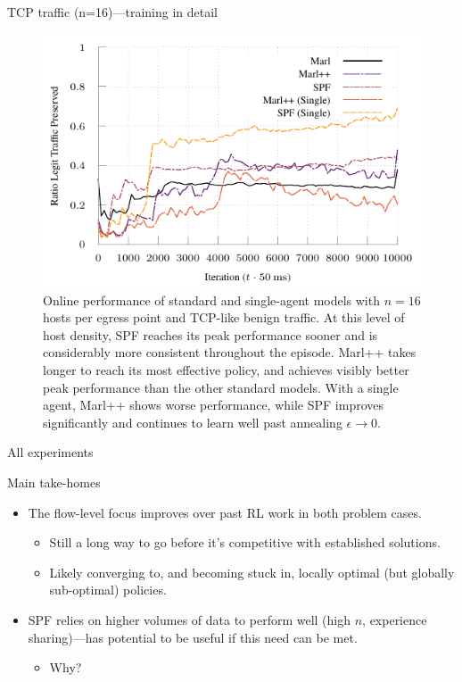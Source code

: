 \documentclass[aspectratio=169,xcolor={dvipsnames}
,hide notes
]{beamer}
\begin{document}
\begin{frame}{TCP traffic (n=16)---training in detail}
	\begin{figure}
		\centering
		\includegraphics[width=0.8\linewidth]{../plots/tcp-16-single}
		
		\caption{
			Online performance of standard and single-agent models with $n=16$ hosts per egress point and TCP-like benign traffic.
			At this level of host density, SPF reaches its peak performance sooner and is considerably more consistent throughout the episode.
			Marl++ takes longer to reach its most effective policy, and achieves visibly better peak performance than the other standard models.
			With a single agent, Marl++ shows worse performance, while SPF improves significantly and continues to learn well past annealing $\epsilon \rightarrow 0$.
			\label{fig:tcp-16}
		}
	\end{figure}
\end{frame}

\begin{frame}{All experiments}
	\begin{table}
		\centering
		\caption{Average reward for combinations of model, host density and traffic class.\label{tab:av-vals}}
	\end{table}
\end{frame}

\begin{frame}{Main take-homes}
\begin{itemize}
	\item The flow-level focus \alert{improves over past RL work in both problem cases}.
	\begin{itemize}
		\item Still a long way to go before it's competitive with established solutions.
		\item Likely converging to, and becoming stuck in, locally optimal (but globally sub-optimal) policies.
	\end{itemize}
	\item SPF relies on higher volumes of data to perform well (high $n$, experience sharing)---has potential to be useful if this need can be met.
	\begin{itemize}
		\item Why?
	\end{itemize}
\end{itemize}
\end{frame}
\end{document}
